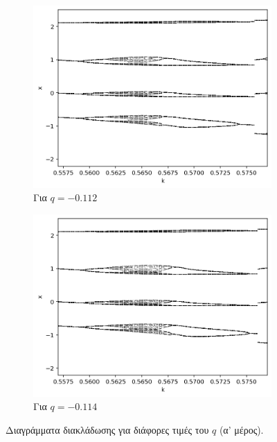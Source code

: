 \begin{figure}[ht]
	\centering
	
	\begin{subfigure}[b]{1\textwidth}
		\centering
		\includegraphics[width=\textwidth]{LateX images/graphs/g3}
		\caption{Για $q=-0.112$}
		\label{f:g3}
	\end{subfigure}
	\hfill
	\begin{subfigure}[b]{1\textwidth}
		\centering
		\includegraphics[width=\textwidth]{LateX images/graphs/g4}
		\caption{Για $q=-0.114$}
		\label{f:g4}
	\end{subfigure}
	\hfill
	\caption{Διαγράμματα διακλάδωσης για διάφορες τιμές του $q$ (α' μέρος). }
	\label{f:g211}
\end{figure}

